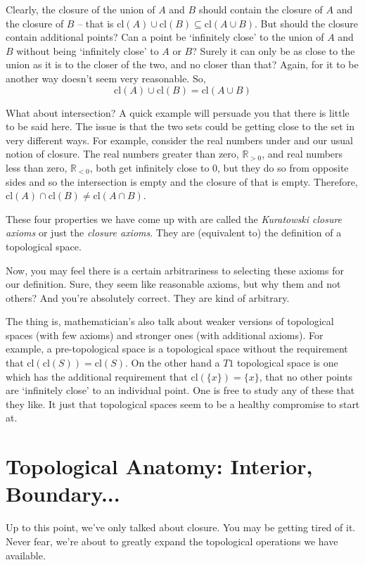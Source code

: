 \documentclass{report}
\newcommand{\cl}{\mathrm{cl}}
\begin{document}
Clearly, the closure of the union of $A$ and $B$ should contain the closure of $A$ and the closure of $B$ -- that is $\cl(A)∪\cl(B) ⊆ \cl(A∪B)$. But should the closure contain additional points? Can a point be `infinitely close' to the union of $A$ and $B$ without being `infinitely close' to $A$ or $B$? Surely it can only be as close to the union as it is to the closer of the two, and no closer than that? Again, for it to be another way doesn't seem very reasonable. So, $$\cl(A)∪\cl(B) = \cl(A∪B)$$

What about intersection? A quick example will persuade you that there is little to be said here. The issue is that the two sets could be getting close to the set in very different ways. For example, consider the real numbers under and our usual notion of closure. The real numbers greater than zero, $ℝ_{>0}$, and real numbers less than zero, $ℝ_{<0}$, both get infinitely close to $0$, but they do so from opposite sides and so the intersection is empty and the closure of that is empty. Therefore, $\cl(A)∩\cl(B) ≠ \cl(A∩B)$.

These four properties we have come up with are called the \emph{Kuratowski closure axioms} or just the \emph{closure axioms}. They are (equivalent to) the definition of a topological space.

Now, you may feel there is a certain arbitrariness to selecting these axioms for our definition. Sure, they seem like reasonable axioms, but why them and not others? And you're absolutely correct. They are kind of arbitrary.

The thing is, mathematician's also talk about weaker versions of topological spaces (with few axioms) and stronger ones (with additional axioms). For example, a pre-topological space is a topological space without the requirement that $\cl(\cl(S)) = \cl(S)$. On the other hand a $T1$ topological space is one which has the additional requirement that $\cl(\{x\}) = \{x\}$, that no other points are `infinitely close' to an individual point. One is free to study any of these that they like. It just that topological spaces seem to be a healthy compromise to start at.

\section{Topological Anatomy: Interior, Boundary...}

Up to this point, we've only talked about closure. You may be getting tired of it. Never fear, we're about to greatly expand the topological operations we have available.
\end{document}
